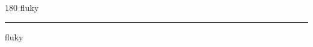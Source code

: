 
\begin{frame}
\begin{center}
\begin{turn}{180}
{\fontsize{2.5cm}{1em}\selectfont fluky}
\end{turn}
\vspace{1em}\par  
\hrule
\vspace{1em}\par  
{\fontsize{2.5cm}{1em}\selectfont fluky}
\end{center}
\end{frame}
